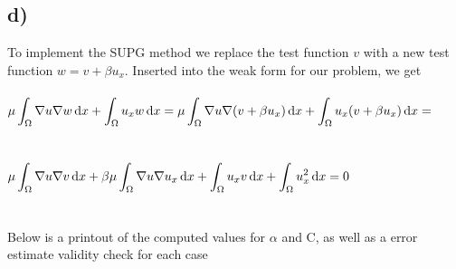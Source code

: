 \documentclass[a4paper,english,12pt,twoside]{article}
\begin{document}
\newpage

\subsection*{d)}

To implement the SUPG method we replace the test function $v$ with a new test function $w = v + \beta u_x$. Inserted into the weak form for our problem, we get\\
\\
$\displaystyle \mu \int_{\Omega}\nabla u \nabla w \mathop{}\!\mathrm{d} x + \int_{\Omega}u_x w \mathop{}\!\mathrm{d} x = \mu \int_{\Omega}\nabla u \nabla ( v + \beta u_x) \mathop{}\!\mathrm{d} x + \int_{\Omega}u_x ( v + \beta u_x) \mathop{}\!\mathrm{d} x = $\\
\\
\\
$\displaystyle \mu \int_{\Omega}\nabla u \nabla v \mathop{}\!\mathrm{d} x + \beta \mu \int_{\Omega}\nabla u \nabla u_x \mathop{}\!\mathrm{d} x + \int_{\Omega}u_x  v  \mathop{}\!\mathrm{d} x + \int_{\Omega}u_x^2 \mathop{}\!\mathrm{d} x = 0$\\
\\
\\
Below is a printout of the computed values for $\alpha$ and C, as well as a error estimate validity check for each case
\end{document}
